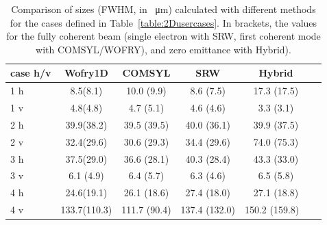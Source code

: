 \documentclass{iucr}              %
\newcommand{\inblue}[1]{{\color{blue}#1}}
\begin{document}
\begin{table}[]
    \label{table:comparison}
    \caption{Comparison of sizes (FWHM, in \SI{}{\micro\meter}) calculated with different methods for the cases defined in Table~\ref{table:2Dusercases}.
    In brackets, the values for the fully coherent beam (single electron with SRW, first coherent mode with COMSYL/WOFRY), and zero emittance with Hybrid).
    }
    \centering
    \begin{tabular}{p{}|c|c|c|c|c}
         case h/v &
         Wofry1D&
         COMSYL&
         SRW&
         Hybrid \\
         \hline
1 h  & 8.5(8.1)    & 10.0 (9.9)  & 8.6 (7.5)   & 17.3 (17.5) \\
1 v  & 4.8(4.8)    & 4.7 (5.1)   & 4.6 (4.6)   & 3.3 (3.1) \\
\hline
2 h  & 39.9(38.2)  & 39.5 (39.5) & 40.0 (36.1)  & 39.9 (37.5) \\
2 v  & 32.4(29.6)  & 30.6 (29.3) & 34.4 (29.6)  & 74.0 (75.3) \\
\hline
3 h  & 37.5(29.0)  & 36.6 (28.1) & 40.3 (28.4)  & 43.3 (33.0) \\
3 v  & 6.1 (4.9)   & 6.4 (5.7)   & 6.3 (4.6)    & 6.5 (5.8) \\
\hline
4 h  & 24.6(19.1)  & 26.1 (18.6)  & 27.4 (18.0)   & 27.1 (18.8) \\
4 v  & 133.7(110.3)& 111.7 (90.4) & 137.4 (132.0) & 150.2 (159.8) \
    \end{tabular}
\end{table}
\end{document}
